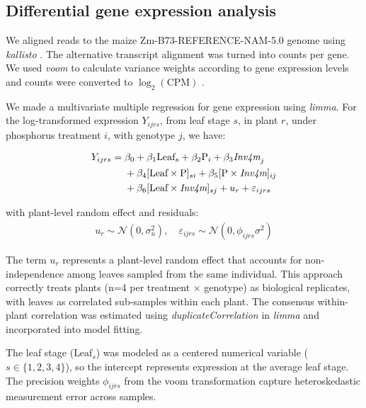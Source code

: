 \documentclass[9pt,twocolumn,twoside]{rilabRxiv}
\newcommand{\invfour}{\textit{Inv4m}\xspace}
\begin{document}
\subsection{Differential gene expression analysis}

We aligned reads to the maize Zm-B73-REFERENCE-NAM-5.0 genome using \textit{kallisto} \cite{bray2016}.
The alternative transcript alignment was turned into counts per gene.
We used \textit{voom} to calculate variance weights according to gene expression levels and counts were converted to $\log_2(\text{CPM})$ \cite{ritchie2015}.

We made a multivariate multiple regression for gene expression using \textit{limma}.
For the log-transformed expression $Y_{ijrs}$, from leaf stage $s$, in plant $r$, under phosphorus treatment $i$, with genotype $j$, we have:

\begin{eqnarray}
\begin{aligned}
Y_{ijrs} = {}& \beta_0 + \beta_1 \text{Leaf}_s + \beta_2 \text{P}_i +
\beta_3 \textit{\invfour}_j \\
& + \beta_4 [\text{Leaf} \times \text{P}]_{si} +
\beta_5 [\text{P} \times \textit{\invfour}]_{ij} \\
& + \beta_6 [\text{Leaf} \times \textit{\invfour}]_{sj} +
u_r + \varepsilon_{ijrs}
\end{aligned}
\end{eqnarray}

with plant-level random effect and residuals:
\begin{eqnarray}
u_r \sim \mathcal{N}(0, \sigma^2_u), \quad
\varepsilon_{ijrs} \sim \mathcal{N}(0, \phi_{ijrs}\sigma^2)
\end{eqnarray}

The term $u_r$ represents a plant-level random effect that accounts for non-independence among leaves sampled from the same individual.
This approach correctly treats plants (n=4 per treatment $\times$ genotype) as biological replicates, with leaves as correlated sub-samples within each plant.
The consensus within-plant correlation was estimated using \textit{duplicateCorrelation} in \textit{limma} and incorporated into model fitting.

The leaf stage ($\text{Leaf}_s$) was modeled as a centered numerical variable ($s \in \{1,2,3,4\}$), so the intercept represents expression at the average leaf stage.
The precision weights $\phi_{ijrs}$ from the voom transformation capture heteroskedastic measurement error across samples.
\end{document}
